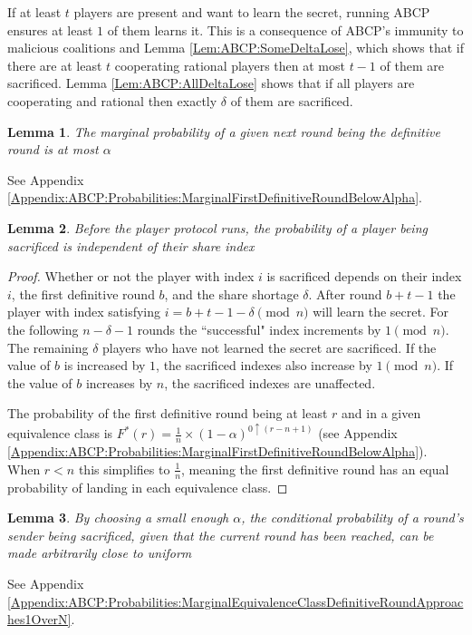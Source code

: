 \documentclass{dalcsthesis}
\newtheorem{lemma}{Lemma}
\begin{document}
If at least $t$ players are present and want to learn the secret, running ABCP ensures at least $1$ of them learns it. This is a consequence of ABCP's immunity to malicious coalitions and Lemma \ref{Lem:ABCP:SomeDeltaLose}, which shows that if there are at least $t$ cooperating rational players then at most $t-1$ of them are sacrificed. Lemma \ref{Lem:ABCP:AllDeltaLose} shows that if all players are cooperating and rational then exactly $\delta$ of them are sacrificed.

\begin{lemma} The marginal probability of a given next round being the definitive round is at most $\alpha$ \label{Lem:ABPC:MarginalAtMostAlpha} \end{lemma}
See Appendix \ref{Appendix:ABCP:Probabilities:MarginalFirstDefinitiveRoundBelowAlpha}.

\begin{lemma} Before the player protocol runs, the probability of a player being sacrificed is independent of their share index \label{Lem:ABCP:FairSacrificeBefore} \end{lemma}
\begin{proof}
Whether or not the player with index $i$ is sacrificed depends on their index $i$, the first definitive round $b$, and the share shortage $\delta$. After round $b+t-1$ the player with index satisfying $i = b+t-1-\delta \pmod{n}$ will learn the secret. For the following $n-\delta-1$ rounds the ``successful" index increments by $1 \pmod{n}$. The remaining $\delta$ players who have not learned the secret are sacrificed. If the value of $b$ is increased by $1$, the sacrificed indexes also increase by $1 \pmod{n}$. If the value of $b$ increases by $n$, the sacrificed indexes are unaffected.

The probability of the first definitive round being at least $r$ and in a given equivalence class is $F^{*}(r) = \frac{1}{n} \times (1-\alpha)^{0 \uparrow (r - n + 1)}$ (see Appendix \ref{Appendix:ABCP:Probabilities:MarginalFirstDefinitiveRoundBelowAlpha}). When $r < n$ this simplifies to $\frac{1}{n}$, meaning the first definitive round has an equal probability of landing in each equivalence class.
\end{proof}

\begin{lemma} By choosing a small enough $\alpha$, the conditional probability of a round's sender being sacrificed, given that the current round has been reached, can be made arbitrarily close to uniform \label{Lem:ABCP:FairerDuringWithSmallAlpha} \end{lemma}
See Appendix \ref{Appendix:ABCP:Probabilities:MarginalEquivalenceClassDefinitiveRoundApproaches1OverN}.
\end{document}
